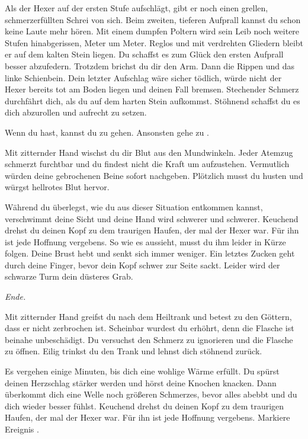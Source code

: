Als der Hexer auf der ersten Stufe aufschlägt, gibt er noch einen grellen, schmerzerfüllten Schrei von sich. Beim zweiten, tieferen Aufprall kannst du schon keine Laute mehr hören.
Mit einem dumpfen Poltern wird sein Leib noch weitere Stufen hinabgerissen, Meter um Meter.
Reglos und mit verdrehten Gliedern bleibt er auf dem kalten Stein liegen. Du schaffst es zum Glück den ersten Aufprall besser abzufedern. Trotzdem brichst du dir den Arm. Dann die Rippen und das linke Schienbein. Dein letzter Aufschlag wäre sicher tödlich, würde nicht der Hexer bereits tot am Boden liegen und deinen Fall bremsen. Stechender Schmerz durchfährt dich, als du auf dem harten Stein aufkommst. Stöhnend schaffst du es dich abzurollen und aufrecht zu setzen.

Wenn du  hast, kannst du zu  gehen.
Ansonsten gehe zu .


Mit zitternder Hand wischst du dir Blut aus den Mundwinkeln. Jeder Atemzug schmerzt furchtbar und du findest nicht die Kraft um aufzustehen. Vermutlich würden deine gebrochenen Beine sofort nachgeben. Plötzlich musst du husten und würgst hellrotes Blut hervor.

Während du überlegst, wie du aus dieser Situation entkommen kannst, verschwimmt deine Sicht und deine Hand wird schwerer und schwerer. Keuchend drehst du deinen Kopf zu dem traurigen Haufen, der mal der Hexer war. Für ihn ist jede Hoffnung vergebens. So wie es aussieht, musst du ihm leider in Kürze folgen. Deine Brust hebt und senkt sich immer weniger. Ein letztes Zucken geht durch deine Finger, bevor dein Kopf schwer zur Seite sackt. Leider wird der schwarze Turm dein düsteres Grab.

\textit{Ende.}


Mit zitternder Hand greifst du nach dem Heiltrank und betest zu den Göttern, dass er nicht zerbrochen ist. Scheinbar wurdest du erhöhrt, denn die Flasche ist beinahe unbeschädigt. Du versuchst den Schmerz zu ignorieren und die Flasche zu öffnen. Eilig trinkst du den Trank und lehnst dich stöhnend zurück.

Es vergehen einige Minuten, bis dich eine wohlige Wärme erfüllt. Du spürst deinen Herzschlag stärker werden und hörst deine Knochen knacken. Dann überkommt dich eine Welle noch größeren Schmerzes, bevor alles abebbt und du dich wieder besser fühlst. Keuchend drehst du deinen Kopf zu dem traurigen Haufen, der mal der Hexer war. Für ihn ist jede Hoffnung vergebens.
Markiere Ereignis .

